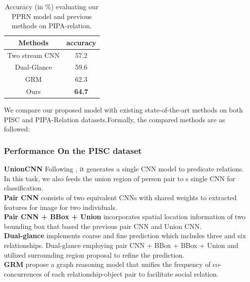 \documentclass{article}
\newcommand{\PPRN}{{\sf PPRN}}
\begin{document}
\begin{table}[htpb]
  \centering
  \caption{Accuracy (in \%) evaluating our {\PPRN} model and previous methods on PIPA-relation.}
  \label{tab:pipa_table}
  \begin{tabular}{c|c}
    \hline
    Methods & accuracy \\
    \hline\hline
    Two stream CNN \cite{DBLP:conf/cvpr/ZhangPTFB15} & 57.2 \\
    Dual-Glance \cite{DBLP:conf/iccv/LiWZK17} & 59.6 \\
    GRM \cite{DBLP:conf/ijcai/WangCRYCL18} & 62.3 \\
    \hline
    Ours & \textbf{64.7}\\
    \hline
  \end{tabular}
\end{table}

We compare our proposed model with existing state-of-the-art methods on both PISC and PIPA-Relation datasets.Formally, the compared methods are as followed:

\subsubsection{Performance On the PISC dataset}

{\bf UnionCNN}  Following \cite{DBLP:conf/eccv/LuKBL16}, it generates a single CNN model to predicate relations. In this task, we also feeds the union region of person pair to s single CNN for classification.\\
{\bf Pair CNN}\cite{DBLP:conf/iccv/LiWZK17} consists of two equivalent CNNs with shared weights to extracted features for image for two individuals.\\
{\bf Pair CNN + BBox + Union}\cite{DBLP:conf/iccv/LiWZK17} incorporates spatial location information of two bounding box that based the previous pair CNN and Union CNN.\\
{\bf Dual-glance}\cite{DBLP:conf/iccv/LiWZK17} implements coarse and fine prediction which includes three and six relationships. Dual-glance employing pair CNN + BBox + BBox + Union and utilized surrounding region proposal to refine the prediction.\\
{\bf GRM}\cite{DBLP:conf/ijcai/WangCRYCL18} propose a graph reasoning model that unifies the frequency of co-concurrences of each relationship-object pair to facilitate social relation.
\end{document}
